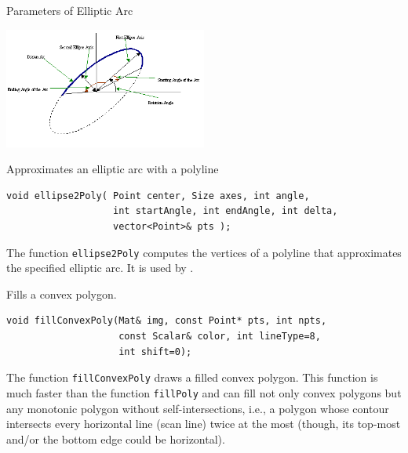 Parameters of Elliptic Arc

\includegraphics[width=0.5\textwidth]{pics/ellipse.png}

\label{ellipse2Poly}
Approximates an elliptic arc with a polyline

\begin{lstlisting}
void ellipse2Poly( Point center, Size axes, int angle,
                   int startAngle, int endAngle, int delta,
                   vector<Point>& pts );
\end{lstlisting}
\begin{description}
\end{description}

The function \texttt{ellipse2Poly} computes the vertices of a polyline that approximates the specified elliptic arc. It is used by .

\label{fillConvexPoly}
Fills a convex polygon.

\begin{lstlisting}
void fillConvexPoly(Mat& img, const Point* pts, int npts,
                    const Scalar& color, int lineType=8,
                    int shift=0);
\end{lstlisting}
\begin{description}
\end{description}

The function \texttt{fillConvexPoly} draws a filled convex polygon.
This function is much faster than the function \texttt{fillPoly}
and can fill not only convex polygons but any monotonic polygon without self-intersections,
i.e., a polygon whose contour intersects every horizontal line (scan
line) twice at the most (though, its top-most and/or the bottom edge could be horizontal).

